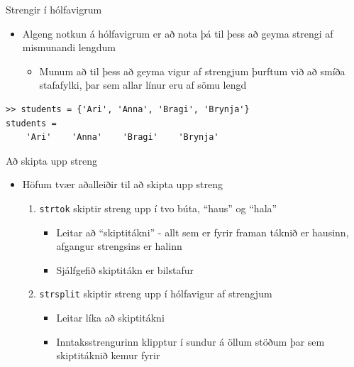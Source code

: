 \documentclass{beamer}
\begin{document}
\begin{frame}[fragile]{Strengir í hólfavigrum}
\begin{itemize}
 \item Algeng notkun á hólfavigrum er að nota þá til þess að geyma strengi af mismunandi lengdum
 \begin{itemize}
  \item Munum að til þess að geyma vigur af strengjum þurftum við að smíða stafafylki, þar sem allar línur eru af sömu lengd
 \end{itemize}
\end{itemize}
\begin{verbatim}
>> students = {'Ari', 'Anna', 'Bragi', 'Brynja'}
students = 
    'Ari'    'Anna'    'Bragi'    'Brynja'
\end{verbatim}
\end{frame}

\begin{frame}[fragile]{Að skipta upp streng}
\begin{itemize}
 \item Höfum tvær aðalleiðir til að skipta upp streng
 \begin{enumerate}
  \item \texttt{strtok} skiptir streng upp í tvo búta, ``haus'' og ``hala''
  \begin{itemize}
   \item Leitar að ``skiptitákni'' - allt sem er fyrir framan táknið er hausinn, afgangur strengsins er halinn
   \item Sjálfgefið skiptitákn er bilstafur
  \end{itemize}
  \item \texttt{strsplit} skiptir streng upp í hólfavigur af strengjum
  \begin{itemize}
   \item Leitar líka að skiptitákni
   \item Inntaksstrengurinn klipptur í sundur á öllum stöðum þar sem skiptitáknið kemur fyrir
  \end{itemize}
 \end{enumerate}
\end{itemize}
\end{frame}
\end{document}
